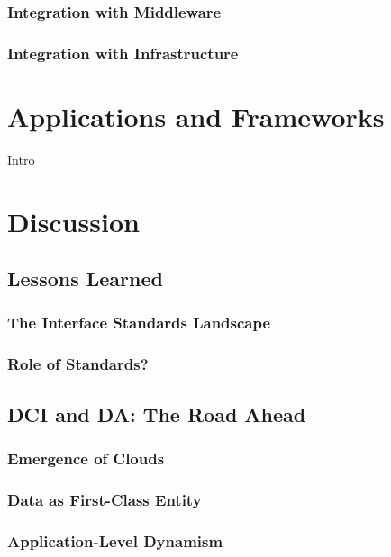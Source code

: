 \documentclass[a4paper,10pt]{article}
\begin{document}
\subsubsection{Integration with Middleware}
\subsubsection{Integration with Infrastructure}


\section{Applications and Frameworks}
\label{apps_and_frameworks}

Intro

\section{Discussion}

\subsection{Lessons Learned}

\subsubsection{The Interface Standards Landscape}\label{interface_landscape}
\subsubsection{Role of Standards?}

\subsection{DCI and DA: The Road Ahead}

\subsubsection{Emergence of Clouds}

\subsubsection{Data as First-Class Entity}

\subsubsection{Application-Level Dynamism}

 
\end{document}
